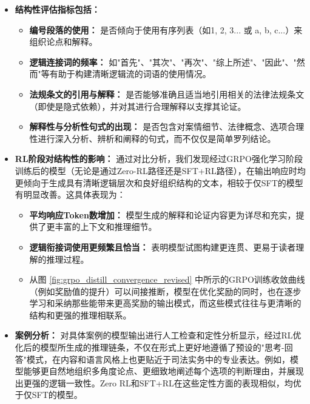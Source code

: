 \documentclass{pkuthesis}
\begin{document}
\begin{itemize}
    \item \textbf{结构性评估指标包括：}
    \begin{itemize}
        \item \textbf{编号段落的使用：} 是否倾向于使用有序列表（如1, 2, 3... 或 a, b, c...）来组织论点和解释。
        \item \textbf{逻辑连接词的频率：} 如"首先"、"其次"、"再次"、"综上所述"、"因此"、"然而"等有助于构建清晰逻辑流的词语的使用情况。
        \item \textbf{法规条文的引用与解释：} 是否能够准确且适当地引用相关的法律法规条文（即使是隐式依赖），并对其进行合理解释以支撑其论证。
        \item \textbf{解释性与分析性句式的出现：} 是否包含对案情细节、法律概念、选项合理性进行深入分析、辨析和阐释的句式，而不仅仅是简单罗列结论。
    \end{itemize}
    \item \textbf{RL阶段对结构性的影响：} 通过对比分析，我们发现经过GRPO强化学习阶段训练后的模型（无论是通过Zero-RL路径还是SFT+RL路径），在输出响应时均更倾向于生成具有清晰逻辑层次和良好组织结构的文本，相较于仅SFT的模型有明显改善。这具体表现为：
    \begin{itemize}
        \item \textbf{平均响应Token数增加：} 模型生成的解释和论证内容更为详尽和充实，提供了更丰富的上下文和推理细节。
        \item \textbf{逻辑衔接词使用更频繁且恰当：} 表明模型试图构建更连贯、更易于读者理解的推理过程。
        \item 从图 \ref{fig:grpo_distill_convergence_revised} 中所示的GRPO训练收敛曲线（例如奖励值的提升）可以间接推断，模型在优化奖励的同时，也在逐步学习和采纳那些能带来更高奖励的输出模式，而这些模式往往与更清晰的结构和更强的推理相联系。
    \end{itemize}
    \item \textbf{案例分析：} 对具体案例的模型输出进行人工检查和定性分析显示，经过RL优化后的模型所生成的推理链条，不仅在形式上更好地遵循了预设的"思考-回答"模式，在内容和语言风格上也更贴近于司法实务中的专业表达。例如，模型能够更自然地组织多角度论点、更细致地阐述每个选项的判断理由，并展现出更强的逻辑一致性。Zero RL和SFT+RL在这些定性方面的表现相似，均优于仅SFT的模型。
\end{itemize}
\end{document}
